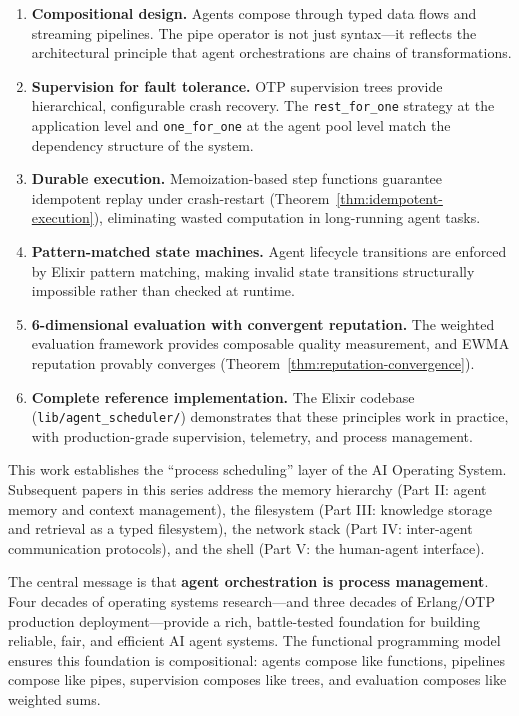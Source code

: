 \documentclass[12pt,a4paper]{article}
\theoremstyle{definition}
\theoremstyle{remark}
\begin{document}
\begin{enumerate}[leftmargin=2em]
  \item \textbf{Compositional design.} Agents compose through typed data flows and streaming pipelines. The pipe operator is not just syntax---it reflects the architectural principle that agent orchestrations are chains of transformations.

  \item \textbf{Supervision for fault tolerance.} OTP supervision trees provide hierarchical, configurable crash recovery. The \texttt{rest\_for\_one} strategy at the application level and \texttt{one\_for\_one} at the agent pool level match the dependency structure of the system.

  \item \textbf{Durable execution.} Memoization-based step functions guarantee idempotent replay under crash-restart (Theorem~\ref{thm:idempotent-execution}), eliminating wasted computation in long-running agent tasks.

  \item \textbf{Pattern-matched state machines.} Agent lifecycle transitions are enforced by Elixir pattern matching, making invalid state transitions structurally impossible rather than checked at runtime.

  \item \textbf{6-dimensional evaluation with convergent reputation.} The weighted evaluation framework provides composable quality measurement, and EWMA reputation provably converges (Theorem~\ref{thm:reputation-convergence}).

  \item \textbf{Complete reference implementation.} The Elixir codebase (\texttt{lib/agent\_scheduler/}) demonstrates that these principles work in practice, with production-grade supervision, telemetry, and process management.
\end{enumerate}

This work establishes the ``process scheduling'' layer of the AI Operating System. Subsequent papers in this series address the memory hierarchy (Part II: agent memory and context management), the filesystem (Part III: knowledge storage and retrieval as a typed filesystem), the network stack (Part IV: inter-agent communication protocols), and the shell (Part V: the human-agent interface).

The central message is that \textbf{agent orchestration is process management}. Four decades of operating systems research---and three decades of Erlang/OTP production deployment---provide a rich, battle-tested foundation for building reliable, fair, and efficient AI agent systems. The functional programming model ensures this foundation is compositional: agents compose like functions, pipelines compose like pipes, supervision composes like trees, and evaluation composes like weighted sums.
\end{document}
